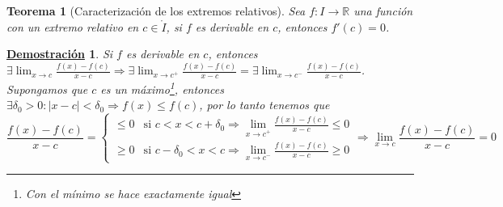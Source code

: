 \documentclass[10pt,a4paper,openright]{book}
\theoremstyle{break}
\newtheorem{theo}{Teorema}[chapter]
\newtheorem*{demo}{\underline{Demostración}}
\begin{document}
\begin{theo}[Caracterización de los extremos relativos]
Sea $f: I\rightarrow \mathbb R$ una función con un extremo relativo en $c\in \mathring{I}$, si $f$ es derivable en $c$, entonces $f'(c)=0$.
\end{theo}
\begin{demo}
Si $f$ es derivable en $c$, entonces $\exists \lim_{x\rightarrow c} \frac{f(x)-f(c)}{x-c}\Rightarrow \exists \lim_{x\rightarrow c^+} \frac{f(x)-f(c)}{x-c} = \exists \lim_{x\rightarrow c^-} \frac{f(x)-f(c)}{x-c}$. Supongamos que $c$ es un máximo\footnote{Con el mínimo se hace exactamente igual}, entonces $\exists\delta_0 >0 : |x-c|<\delta_0\Rightarrow f(x)\leq f(c)$, por lo tanto tenemos que
$$\frac{f(x)-f(c)}{x-c}=\begin{cases}\leq 0 &\mbox{si } c<x<c+\delta_0  \Rightarrow \lim_{x\rightarrow c^+}\frac{f(x)-f(c)}{x-c} \leq 0\\ \geq 0 &\mbox{si } c-\delta_0 < x <c  \Rightarrow \lim_{x\rightarrow c^-}\frac{f(x)-f(c)}{x-c} \geq 0\end{cases}\Rightarrow \lim_{x\rightarrow c}\frac{f(x)-f(c)}{x-c}= 0$$
\end{demo}
\end{document}
